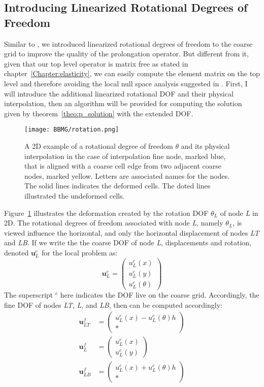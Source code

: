 \subsection{Introducing Linearized Rotational Degrees of Freedom}
Similar to \cite{dohrmann2007interpolation}, we introduced linearized rotational degrees of freedom to the coarse grid to improve the quality of the prolongation operator. But different from it, given that our top level operator is matrix free as stated in chapter~\ref{Chapter:elasticity}, we can easily compute the element matrix on the top level and therefore avoiding the local null space analysis suggested in \cite{dohrmann2007interpolation}. First, I will introduce the additional linearized rotational DOF and their physical interpolation, then an algorithm will be provided for computing the solution given by theorem~\ref{theo:p_solution} with the extended DOF.
\begin{figure}[t]
\texttt{[image: BBMG/rotation.png]}
\centering
\caption{A 2D example of a rotational degree of freedom $\theta$ and its physical interpolation in the case of interpolation fine node, marked blue, that is aligned with a coarse cell edge from two adjacent coarse nodes, marked yellow. Letters are associated names for the nodes. The solid lines indicates the deformed cells. The doted lines illustrated the undeformed cells.}
\label{fig:rotation_2D}
\end{figure}
Figure~\ref{fig:rotation_2D} illustrates the deformation created by the rotation DOF $\theta_L$ of node \textit{L} in 2D. The rotational degrees of freedom associated with node \textit{L}, namely $\theta_L$, is viewed influence the horizontal, and only the horizontal displacement of nodes \textit{LT} and \textit{LB}. If we write the the coarse DOF of node \textit{L}, displacements and rotation, denoted $\mathbf{u}^c_L$ for the local problem as:
$$
\mathbf{u}^c_L = \left(\begin{array}{c}u^c_L(x) \\ u^c_L(y) \\ u^c_L(\theta) \end{array}\right)
$$
The superscript $^c$ here indicates the DOF live on the coarse grid. Accordingly, the fine DOF of nodes \textit{LT}, \textit{L}, and \textit{LB}, then can be computed accordingly:
\begin{align*}
 \mathbf{u}^f_{LT} &= \left(\begin{array}{c} u^c_L(x) - u^c_L(\theta)h \\ * \end{array}\right) \\
 \mathbf{u}^f_{L} &= \left(\begin{array}{c} u^c_L(x) \\ u^c_L(y) \end{array}\right) \\
 \mathbf{u}^f_{LB} &= \left(\begin{array}{c} u^c_L(x) + u^c_L(\theta)h \\ * \end{array}\right) 
\end{align*}
